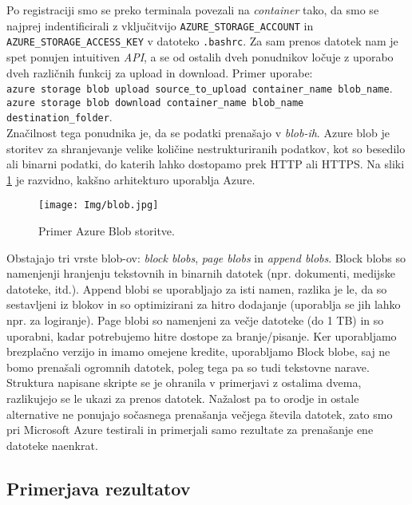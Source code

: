 \documentclass[11pt]{article}
\begin{document}
Po registraciji smo se preko terminala povezali na \textit{container} tako, da smo se najprej indentificirali z vključitvijo \texttt{AZURE\_STORAGE\_ACCOUNT} in
\texttt{AZURE\_STORAGE\_ACCESS\_KEY} v datoteko \texttt{.bashrc}. Za sam prenos datotek nam je spet ponujen intuitiven \textit{API}, a se od ostalih dveh ponudnikov ločuje z uporabo dveh različnih funkcij za upload in download. Primer uporabe:\\
\texttt{azure storage blob upload source\_to\_upload container\_name blob\_name}.\\
\texttt{azure storage blob download container\_name blob\_name destination\_folder}.\\

Značilnost tega ponudnika je, da se podatki prenašajo v \textit{blob-ih}. Azure blob je storitev za shranjevanje velike količine nestrukturiranih podatkov, kot so besedilo ali binarni podatki, do katerih lahko dostopamo prek HTTP ali HTTPS. Na sliki \ref{fig:blob} je razvidno, kakšno arhitekturo uporablja Azure.
\begin{figure}[H]
    \begin{center}
        \texttt{[image: Img/blob.jpg]}
        \caption{Primer Azure Blob storitve.}
        \label{fig:blob}
    \end{center}
\end{figure}
Obstajajo tri vrste blob-ov: \textit{block blobs}, \textit{page blobs} in \textit{append blobs}. Block blobs so namenjenji hranjenju tekstovnih in binarnih datotek (npr. dokumenti, medijske datoteke, itd.). Append blobi se uporabljajo za isti namen, razlika je le, da so sestavljeni iz blokov in so optimizirani za hitro dodajanje (uporablja se jih lahko npr. za logiranje). Page blobi so namenjeni za večje datoteke (do 1 TB) in so uporabni, kadar potrebujemo hitre dostope za branje/pisanje. Ker uporabljamo brezplačno verzijo in imamo omejene kredite, uporabljamo Block blobe, saj ne bomo prenašali ogromnih datotek, poleg tega pa so tudi tekstovne narave. \\

Struktura napisane skripte se je ohranila v primerjavi z ostalima dvema, razlikujejo se le ukazi za prenos datotek. Nažalost pa to orodje in ostale alternative ne ponujajo sočasnega prenašanja večjega števila datotek, zato smo pri Microsoft Azure testirali in primerjali samo rezultate za prenašanje ene datoteke naenkrat.

\subsection{Primerjava rezultatov}
\end{document}

